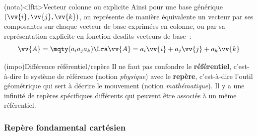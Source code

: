 \documentclass[../../main/main.tex]{subfiles}
\begin{document}
\begin{tcb}(nota)<lftt>{Vecteur colonne ou explicite}
	Ainsi pour une base générique $(\vv{i}, \vv{j}, \vv{k})$, on
	représente de manière équivalente un vecteur par ses composantes sur chaque
	vecteur de base exprimées en colonne, ou par sa représentation explicite en
	fonction desdits vecteurs de base~:
	\[
		\vv{A} = \mqty(a_i\\a_j\\a_k)
		\Lra
		\vv{A} = a_i \vv{i} + a_j \vv{j} + a_k \vv{k}
	\]
\end{tcb}

\begin{tcb}[breakable](impo){Différence référentiel/repère}
	Il ne faut pas confondre le \textbf{référentiel}, c'est-à-dire le système de
	référence (notion \textit{physique}) avec le \textbf{repère}, c'est-à-dire
	l'outil géométrique qui sert à décrire le mouvement (notion
	\textit{mathématique}). Il y a une infinité de repères spécifiques différents
	qui peuvent être associés à un même référentiel.
\end{tcb}

\subsubsection{Repère fondamental cartésien}
\end{document}
